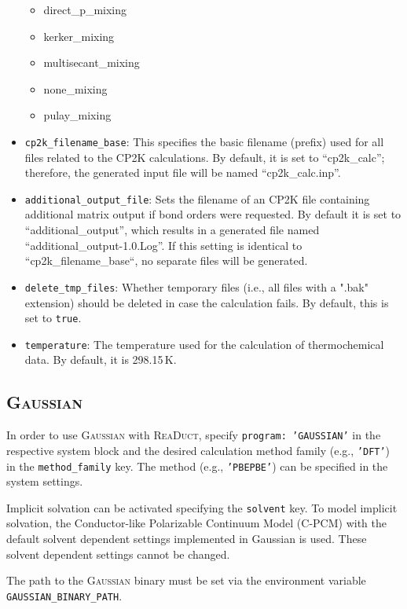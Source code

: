 \documentclass[]{tufte-book}
\begin{document}
\begin{itemize}
\begin{itemize}
                \item direct\_p\_mixing
                \item kerker\_mixing
                \item multisecant\_mixing
                \item none\_mixing
                \item pulay\_mixing
        \end{itemize}
	\item \texttt{cp2k\_filename\_base}: This specifies the basic filename (prefix) used for all files related to the \textsc{CP2K} calculations.
	By default, it is set to ``cp2k\_calc''; therefore, the generated input file will be named ``cp2k\_calc.inp''.
	\item \texttt{additional\_output\_file}: Sets the filename of an \textsc{CP2K} file containing additional matrix output if bond orders were requested.
	By default it is set to ``additional\_output'', which results in a generated file named ``additional\_output-1.0.Log''. If this setting is identical to ``cp2k\_filename\_base``, no separate files will be generated.
	\item \texttt{delete\_tmp\_files}: Whether temporary files (i.e., all files with a ".bak" extension) should be deleted in case
	the calculation fails. By default, this is set to \texttt{true}.
	\item \texttt{temperature}: The temperature used for the calculation of thermochemical data. By default, it is 298.15\,K.
\end{itemize}

\subsection{\textsc{Gaussian}}

In order to use \textsc{Gaussian} with \textsc{ReaDuct}, specify \texttt{program: 'GAUSSIAN'} in the respective system block and the desired
calculation method family (e.g., \texttt{'DFT'}) in the \texttt{method\_family} key.
The method (e.g., \texttt{'PBEPBE'}) can be specified in the system settings.

Implicit solvation can be activated specifying the \texttt{solvent} key.
To model implicit solvation, the Conductor-like Polarizable Continuum Model\cite{cpcm} (C-PCM) with the default solvent dependent settings implemented in Gaussian is used.
These solvent dependent settings cannot be changed.

The path to the \textsc{Gaussian} binary must be set via the environment variable \texttt{GAUSSIAN\_BINARY\_PATH}.
\end{document}
